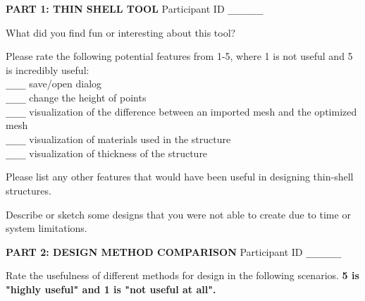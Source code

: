 \documentclass[12pt]{article}
\begin{document}
{\bf PART 1: THIN SHELL TOOL} 
\hfill Participant ID \verb+_______+
\vspace{0.3in}

What did you find fun or interesting about this tool?
\vspace{1.3in}

Please rate the following potential features from 1-5, where 1 is not useful and 5 is incredibly useful: \\

\verb+____+ save/open dialog\\
\verb+____+ change the height of points\\
\verb+____+ visualization of the difference between an imported mesh and the optimized mesh\\
\verb+____+ visualization of materials used in the structure\\
\verb+____+ visualization of thickness of the structure


\vspace{0.3in}

Please list any other features that would have been useful in designing thin-shell structures.
\vspace{1.5in}




Describe or sketch some designs that you were not able to create due
to time or system limitations.
\vspace{1in}



\newpage
{\bf PART 2: DESIGN METHOD COMPARISON} 
\hfill Participant ID \verb+_______+
\vspace{0.3in}

Rate the usefulness of different methods for design
in the following scenarios.  {\bf 5 is "highly useful" and 1 is "not
  useful at all".}


\vspace{0.1in}

\renewcommand\arraystretch{1.4}
\end{document}
